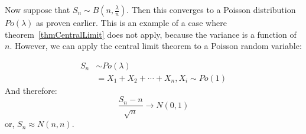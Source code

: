 \documentclass[../Main.tex]{subfiles}
\begin{document}
\begin{example}
    Now suppose that $S_n \sim B\left(n, \frac{\lambda}{n}\right)$. Then this converges to a Poisson distribution $Po(\lambda)$ as proven earlier. This is an example of a case where theorem~\ref{thmCentralLimit} does not apply, because the variance is a function of $n$. However, we can apply the central limit theorem to a Poisson random variable:
    
    \begin{align*}
        S_n &\sim Po(\lambda) \\
        &= X_1 + X_2 + \cdots + X_n, X_i \sim Po(1)
    \end{align*}
    And therefore:
    \begin{equation*}
        \frac{S_n - n}{\sqrt{n}} \to N(0, 1)
    \end{equation*}
    or, $S_n \approx N(n, n)$.
\end{example}
\end{document}
